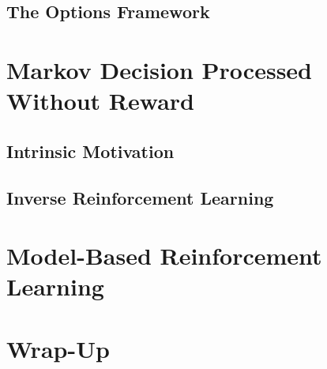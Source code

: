 		\subsection{The Options Framework} %

	\section{Markov Decision Processed Without Reward} %

		\subsection{Intrinsic Motivation} %

		\subsection{Inverse Reinforcement Learning} %

	\section{Model-Based Reinforcement Learning} %

	\section{Wrap-Up} %
